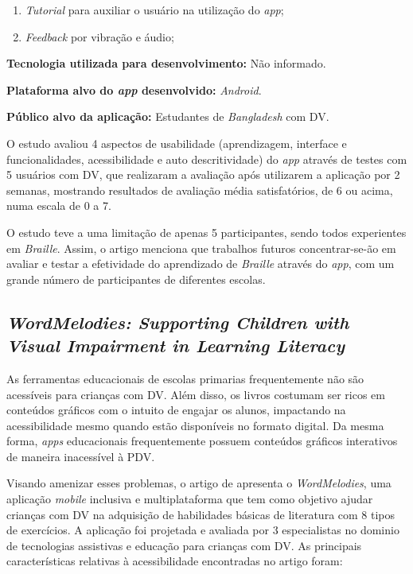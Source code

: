 \begin{enumerate}
    \item \emph{Tutorial} para auxiliar o usuário na utilização do \emph{app};
    \item \emph{Feedback} por vibração e áudio;
\end{enumerate}

\textbf{Tecnologia utilizada para desenvolvimento:} Não informado.

\textbf{Plataforma alvo do \emph{app} desenvolvido:} \emph{Android}.

\textbf{Público alvo da aplicação:} Estudantes de \emph{Bangladesh} com DV\@.

O estudo avaliou 4 aspectos de usabilidade (aprendizagem, interface e funcionalidades, acessibilidade e auto descritividade) do \emph{app} através de testes com 5 usuários com DV, que realizaram a avaliação após utilizarem a aplicação por 2 semanas, mostrando resultados de avaliação média satisfatórios, de 6 ou acima, numa escala de 0 a 7.

O estudo teve a uma limitação de apenas 5 participantes, sendo todos experientes em \emph{Braille}.
Assim, o artigo menciona que trabalhos futuros concentrar-se-ão em avaliar e testar a efetividade do aprendizado de \emph{Braille} através do \emph{app}, com um grande número de participantes de diferentes escolas.


\subsection{\emph{WordMelodies: Supporting Children with Visual Impairment in Learning Literacy}}

As ferramentas educacionais de escolas primarias frequentemente não são acessíveis para crianças com DV\@.
Além disso, os livros costumam ser ricos em conteúdos gráficos com o intuito de engajar os alunos, impactando na acessibilidade mesmo quando estão disponíveis no formato digital.
Da mesma forma, \emph{apps} educacionais frequentemente possuem conteúdos gráficos interativos de maneira inacessível à PDV\@.

Visando amenizar esses problemas, o artigo de  apresenta o \emph{WordMelodies}, uma aplicação \emph{mobile} inclusiva e multiplataforma que tem como objetivo ajudar crianças com DV na adquisição de habilidades básicas de literatura com 8 tipos de exercícios.
A aplicação foi projetada e avaliada por 3 especialistas no dominio de tecnologias assistivas e educação para crianças com DV\@.
As principais características relativas à acessibilidade encontradas no artigo foram:

